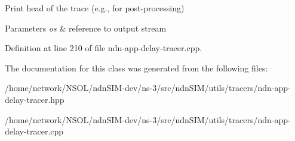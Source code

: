 Print head of the trace (e.\+g., for post-\/processing) 


\begin{DoxyParams}{Parameters}
{\em os} & reference to output stream \\
\hline
\end{DoxyParams}


Definition at line 210 of file ndn-\/app-\/delay-\/tracer.\+cpp.



The documentation for this class was generated from the following files\+:\begin{DoxyCompactItemize}
\item 
/home/network/\+N\+S\+O\+L/ndn\+S\+I\+M-\/dev/ns-\/3/src/ndn\+S\+I\+M/utils/tracers/ndn-\/app-\/delay-\/tracer.\+hpp\item 
/home/network/\+N\+S\+O\+L/ndn\+S\+I\+M-\/dev/ns-\/3/src/ndn\+S\+I\+M/utils/tracers/ndn-\/app-\/delay-\/tracer.\+cpp\end{DoxyCompactItemize}
